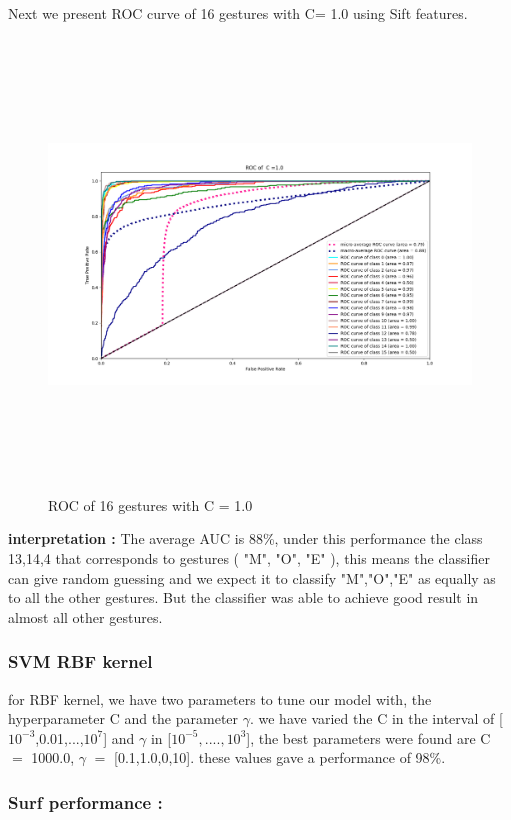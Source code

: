 Next we present ROC curve of 16 gestures with  C= 1.0 using Sift features. 

\begin{figure}[H]
\centering
\includegraphics[width=16cm, height=12cm]{img/roc/sift_ROC_class_C.png}
\caption{ROC of 16 gestures with  C = 1.0 }
\label{fig:rocsift}
\end{figure}

\textbf{interpretation :}
The average AUC is 88\%, under this performance the class  13,14,4 that corresponds to gestures ( "M", "O", "E" ), this means the classifier can give random guessing and we expect it to classify "M","O","E" as equally as to all the other gestures. But the classifier was able to achieve good result in almost  all other gestures.


\subsubsection{SVM RBF kernel}

for RBF kernel, we have two parameters to tune our model with, the hyperparameter C and the parameter $\gamma$. we have varied the C in the interval of [$10^{-3}$,0.01,...,$10^{7}$] and $\gamma$ in [$10^{-5},....,10^{3}$], the best parameters were found are C $=$ 1000.0, $\gamma$ $=$ [0.1,1.0,0,10]. these values gave a performance of 98\%.

\subsubsection{Surf performance : }

